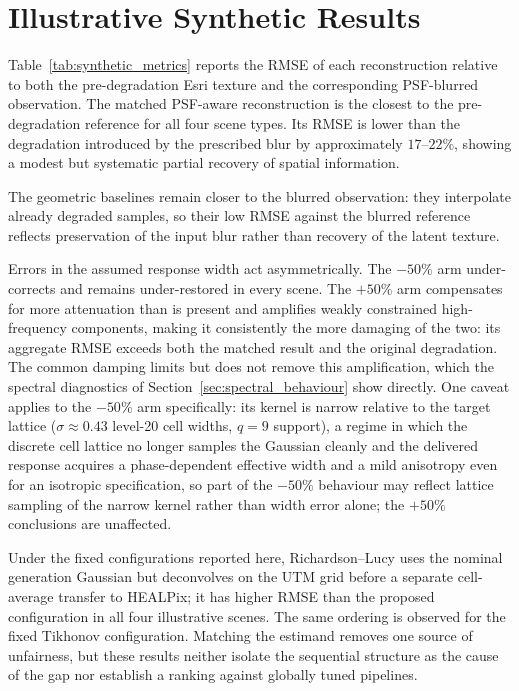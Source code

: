 \documentclass[journal]{IEEEtran}
\newcommand{\healpix}{HEALPix\xspace}
\newcommand{\utm}{UTM\xspace}
\newcommand{\psf}{PSF\xspace}
\begin{document}
\section{Illustrative Synthetic Results}
\label{supp:synthetic_results}

Table~\ref{tab:synthetic_metrics} reports the RMSE of each
reconstruction relative to both the pre-degradation Esri texture and
the corresponding \psf-blurred observation. The matched
\psf-aware reconstruction is the closest to the pre-degradation
reference for all four scene types. Its RMSE is lower than the
degradation introduced by the prescribed blur by approximately
$17$--$22\%$, showing a modest but systematic partial recovery
of spatial information.

The geometric baselines remain closer to the blurred observation:
they interpolate already degraded samples, so their low RMSE
against the blurred reference reflects preservation of the input
blur rather than recovery of the latent texture.

Errors in the assumed response width act asymmetrically. The
$-50\%$ arm under-corrects and remains under-restored in every
scene. The $+50\%$ arm compensates for more attenuation than is
present and amplifies weakly constrained high-frequency components,
making it consistently the more damaging of the two: its aggregate
RMSE exceeds both the matched result and the original degradation.
The common damping limits but does not remove this amplification,
which the spectral diagnostics of
Section~\ref{sec:spectral_behaviour} show directly.
One caveat applies to the $-50\%$ arm specifically: its kernel is
narrow relative to the target lattice ($\sigma\approx0.43$
level-20 cell widths, $q=9$ support), a regime in which the discrete
cell lattice no longer samples the Gaussian cleanly and the
delivered response acquires a phase-dependent effective width and a
mild anisotropy even for an isotropic specification, so part of the
$-50\%$ behaviour may reflect lattice sampling of the narrow kernel
rather than width error alone; the $+50\%$ conclusions are
unaffected.

Under the fixed configurations reported here, Richardson--Lucy uses the
nominal generation Gaussian but deconvolves on the \utm grid before a
separate cell-average transfer to \healpix; it has higher RMSE than the
proposed configuration in all four illustrative scenes. The same ordering is
observed for the fixed Tikhonov configuration. Matching the estimand removes
one source of unfairness, but these results neither isolate the sequential
structure as the cause of the gap nor establish a ranking against globally
tuned pipelines.
\end{document}
